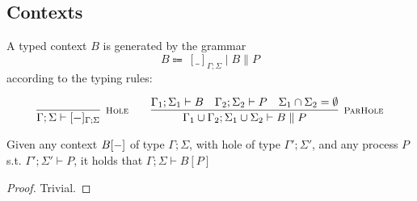 %
%


\subsection*{Contexts}
A typed context $B$ is generated by the grammar
\[
B \Coloneqq \ [\_]_{\Gamma; \Sigma} \mid B \parallel P
\]
according to the typing rules:

\[
  \infer[\mbox{\footnotesize\scshape Hole}]{\Gamma; \Sigma \vdash [\blank]_{\Gamma; \Sigma}}{}
\qquad
\infer[\mbox{\footnotesize\scshape ParHole}]{\Gamma_1 \cup \Gamma_2; \Sigma_1 \cup \Sigma_2 \vdash B \parallel P}
{\Gamma_1; \Sigma_1 \vdash B & \Gamma_2; \Sigma_2 \vdash P & \Sigma_1 \cap \Sigma_2 = \emptyset}
\]


\begin{theorem}
	Given any context $B[{-}]$ of type $\Gamma; \Sigma$, with hole of type $\Gamma'; \Sigma'$, and any process $P$ s.t. $\Gamma'; \Sigma' \vdash P$, it holds that $\Gamma; \Sigma \vdash B[P]$ 
\end{theorem}
\begin{proof}
	Trivial.
\end{proof}